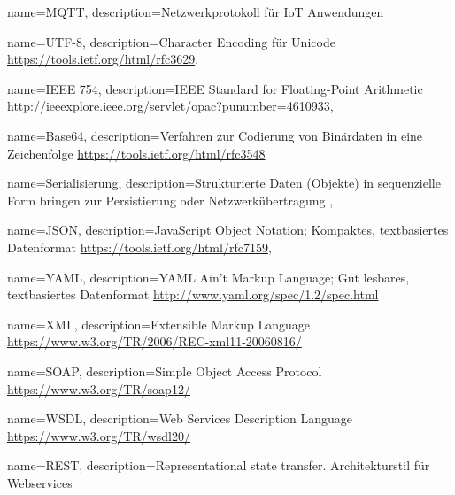 








{
    name=MQTT,
    description={Netzwerkprotokoll für IoT Anwendungen}
}


{
    name=UTF-8,
    description={Character Encoding für Unicode \url{https://tools.ietf.org/html/rfc3629}}, 
}

{
    name=IEEE 754,
    description={IEEE Standard for Floating-Point Arithmetic   \url{http://ieeexplore.ieee.org/servlet/opac?punumber=4610933}}, 
}


{
    name=Base64,
    description={Verfahren zur Codierung von Binärdaten in eine Zeichenfolge
     \url{https://tools.ietf.org/html/rfc3548}}
}

{
    name=Serialisierung,
    description={Strukturierte Daten (Objekte) in sequenzielle Form bringen zur Persistierung oder Netzwerkübertragung }, 
}

{
    name=JSON,
    description={JavaScript Object Notation; Kompaktes, textbasiertes Datenformat
    \url{https://tools.ietf.org/html/rfc7159}}, 
}

{
    name=YAML,
    description={YAML Ain't Markup Language; Gut lesbares, textbasiertes Datenformat
    \url{http://www.yaml.org/spec/1.2/spec.html}}
}

{
    name=XML,
    description={Extensible Markup Language \url{https://www.w3.org/TR/2006/REC-xml11-20060816/}}
}

{
    name=SOAP,
    description={Simple Object Access Protocol \url{https://www.w3.org/TR/soap12/}}
}

{
    name=WSDL,
    description={Web Services Description Language \url{https://www.w3.org/TR/wsdl20/}}
}

{
    name=REST,
    description={Representational state transfer. Architekturstil für Webservices}
}